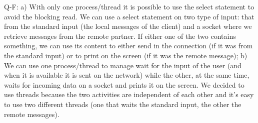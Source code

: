Q-F: a) With only one process/thread it is possible to use the select statement to avoid the blocking read. We can use a select statement on two type of input: that from the standard input (the local messages of the client) and a socket where we retrieve messages from the remote partner. If either one of the two contains something, we can use its content to either send in the connection (if it was from the standard input) or to print on the screen (if it was the remote message);
b) We can use one process/thread to manage wait for the input of the user (and when it is available it is sent on the network) while the other, at the same time, waits for incoming data on a socket and prints it on the screen.
We decided to use threads because the two activities are independent of each other and it's easy to use two different threads (one that waits the standard input, the other the remote messages). 


